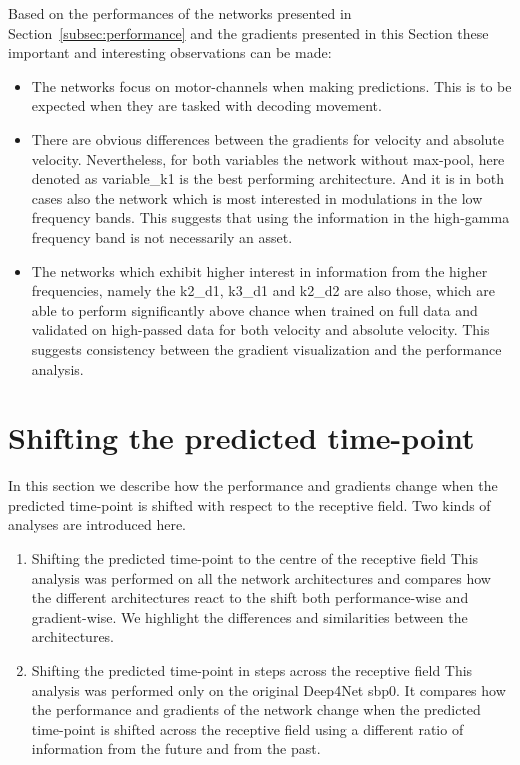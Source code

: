Based on the performances of the networks presented in Section~\ref{subsec:performance} and the gradients presented in this Section these important and interesting observations can be made:

\begin{itemize}
    \item The networks focus on motor-channels when making predictions.
This is to be expected when they are tasked with decoding movement.
    \item There are obvious differences between the gradients for velocity and absolute velocity.
    Nevertheless, for both variables the network without max-pool, here denoted as {variable}\_k1 is the best performing architecture.
    And it is in both cases also the network which is most interested in modulations in the low frequency bands.
    This suggests that using the information in the high-gamma frequency band is not necessarily an asset.
    \item The networks which exhibit higher interest in information from the higher frequencies, namely the k2\_d1, k3\_d1 and k2\_d2 are also those, which are able to perform significantly above chance when trained on full data and validated on high-passed data for both velocity and absolute velocity.
    This suggests consistency between the gradient visualization and the performance analysis.

\end{itemize}


\section{Shifting the predicted time-point}\label{sec:shifting-the-predicted-time-point}
In this section we describe how the performance and gradients change when the predicted time-point is shifted with respect to the receptive field.
Two kinds of analyses are introduced here.

\begin{enumerate}
    \item Shifting the predicted time-point to the centre of the receptive field
This analysis was performed on all the network architectures and compares how the different architectures react to the shift both performance-wise and gradient-wise.
We highlight the differences and similarities between the architectures.
    \item Shifting the predicted time-point in steps across the receptive field
This analysis was performed only on the original Deep4Net sbp0.
It compares how the performance and gradients of the network change when the predicted time-point is shifted across the receptive field using a different ratio of information from the future and from the past.
\end{enumerate}


